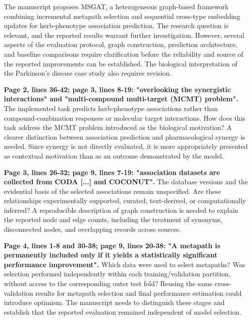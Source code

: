 \documentclass[11pt,american]{article}
\begin{document}
The manuscript proposes MSGAT, a heterogeneous graph-based framework combining incremental metapath selection and sequential cross-type embedding updates for herb-phenotype association prediction. The research question is relevant, and the reported results warrant further investigation. However, several aspects of the evaluation protocol, graph construction, prediction architecture, and baseline comparisons require clarification before the reliability and source of the reported improvements can be established. The biological interpretation of the Parkinson's disease case study also requires revision.

\begin{revcomment}
\textbf{Page 2, lines 36-42; page 3, lines 8-19: "overlooking the synergistic interactions" and "multi-compound multi-target (MCMT) problem".} The implemented task predicts herb-phenotype associations rather than compound-combination responses or molecular target interactions. How does this task address the MCMT problem introduced as the biological motivation? A clearer distinction between association prediction and pharmacological synergy is needed. Since synergy is not directly evaluated, it is more appropriately presented as contextual motivation than as an outcome demonstrated by the model.
\end{revcomment}

\begin{revresponse}

\end{revresponse}

\begin{revcomment}
\textbf{Page 3, lines 26-32; page 9, lines 7-19: "association datasets are collected from CODA [...] and COCONUT".} The database versions and the evidential basis of the selected associations remain unspecified. Are these relationships experimentally supported, curated, text-derived, or computationally inferred? A reproducible description of graph construction is needed to explain the reported node and edge counts, including the treatment of synonyms, disconnected nodes, and overlapping records across sources.
\end{revcomment}

\begin{revresponse}

\end{revresponse}

\begin{revcomment}
\textbf{Page 4, lines 1-8 and 30-38; page 9, lines 20-38: "A metapath is permanently included only if it yields a statistically significant performance improvement".} Which data were used to select metapaths? Was selection performed independently within each training/validation partition, without access to the corresponding outer test fold? Reusing the same cross-validation results for metapath selection and final performance estimation could introduce optimism. The manuscript needs to distinguish these stages and establish that the reported evaluation remained independent of model selection.
\end{revcomment}
\end{document}
